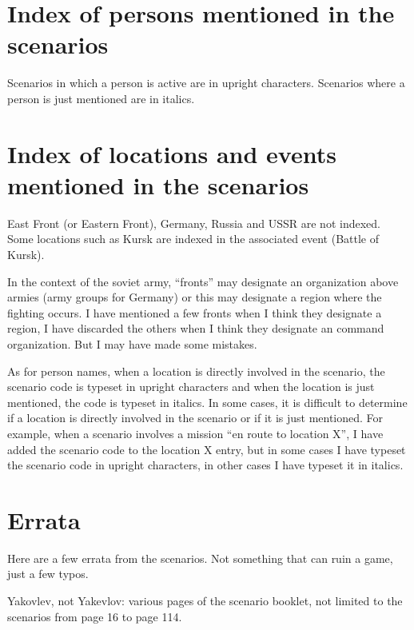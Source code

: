 \documentclass[a4paper,twocolumn]{article}
\begin{document}
\rmfamily
\section*{Index of persons mentioned in the scenarios}

Scenarios in which a person is active are in upright characters.
Scenarios where a person is just mentioned are in italics.

\vspace{3mm}


\section*{Index of locations and events mentioned in the scenarios}

East Front (or Eastern Front), Germany, Russia and USSR are not
indexed. Some locations such as Kursk are indexed in the associated
event (Battle of Kursk).

\vspace{3mm}

In the context of the soviet army, ``fronts'' may designate an
organization above armies (army groups for Germany) or this may
designate a region where the fighting occurs. I have mentioned a few
fronts when I think they designate a region, I have discarded the
others when I think they designate an command organization.
But I may have made some mistakes.

\vspace{3mm}

As for person names, when a location is directly involved in the
scenario, the scenario code is typeset in upright characters and when
the location is just mentioned, the code is typeset in italics.
In some cases, it is difficult to determine if a location is directly
involved in the scenario or if it is just mentioned. For example, when
a scenario involves a mission ``en route to location X'', I have
added the scenario code to the location X entry, but in some cases I have
typeset the scenario code in upright characters, in other cases I have
typeset it in italics.

\vspace{3mm}


\section*{Errata}

Here are a few errata from the scenarios. Not something that can ruin a game, just
a few typos.

Yakovlev, not Yakevlov: various pages of the scenario booklet, not limited
to the scenarios from page 16 to page 114.

\end{document}
